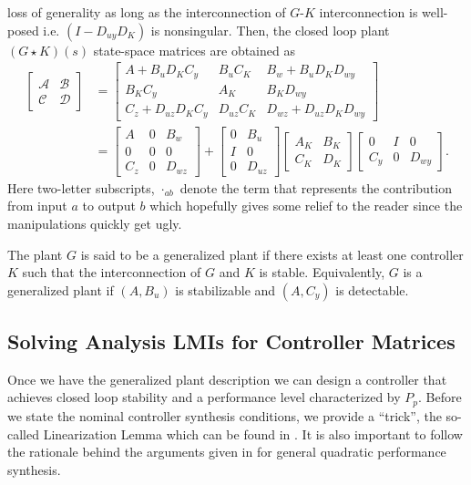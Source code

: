 loss of generality as long as the interconnection of $G$-$K$ interconnection is well-posed i.e. $(I-D_{uy}D_K)$ is nonsingular. Then, 
the closed loop plant $(G\star K)(s)$ state-space matrices are obtained as
\begin{align}
\left[\begin{array}{c|c}
\mathcal{A}	&\mathcal{B} \\\hline
\mathcal{C}	&\mathcal{D}
\end{array}
\right] &= \left[\begin{array}{cc|c}
A + B_uD_KC_y        & B_uC_K    & B_w + B_uD_KD_{wy} \\
B_KC_y               & A_K       & B_KD_{wy}\\ \hline
C_z +  D_{uz}D_KC_y  & D_{uz}C_K & D_{wz} + D_{uz}D_KD_{wy}
\end{array}\right] \\
&= \left[
\begin{array}{cc|c}
A   & 0  & B_w \\
0   & 0  & 0\\ \hline
C_z & 0  & D_{wz}
\end{array}
\right] + 
\left[
\begin{array}{cc}
0  & B_u \\
I  & 0\\ \hline
0  & D_{uz}
\end{array}
\right]
\left[
\begin{array}{cc}
A_K  & B_K \\
C_K  & D_K
\end{array}
\right]
\left[
\begin{array}{cc|c}
0   & I & 0\\
C_y & 0 & D_{wy}
\end{array}
\right].
\label{eq:nominalclinc}
\end{align}
Here two-letter subscripts, $\cdot_{ab}$ denote the term that represents the contribution from input $a$ to output $b$ which hopefully gives some
relief to the reader since the manipulations quickly get ugly. 

\begin{define} The plant $G$ is said to be a generalized plant if there exists at least one controller 
$K$ such that the interconnection of $G$ and $K$ is stable. Equivalently, $G$ is a generalized plant if $(A,B_u)$ is stabilizable
and $(A,C_y)$ is detectable. 
\end{define}


\subsection{Solving Analysis LMIs for Controller Matrices}
Once we have the generalized plant description we can design a controller that achieves closed loop stability and a performance level 
characterized by $P_p$. Before we state the nominal controller synthesis conditions, we provide a \enquote{trick}, the so-called 
Linearization Lemma which can be found in \cite{lmibook99}. It is also important to follow the rationale behind the arguments given
in \cite{scherermulti} for general quadratic performance synthesis. 


